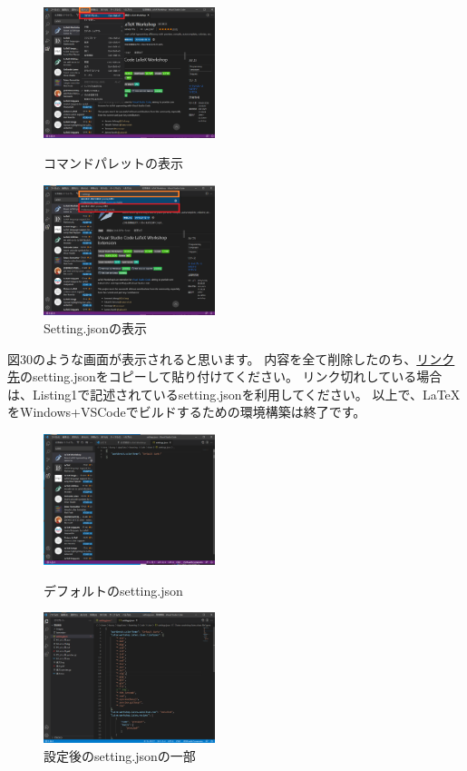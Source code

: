 \documentclass[dvipdfmx]{jsarticle}
\begin{document}
\begin{figure}[H]
    \begin{minipage}[b]{0.45\linewidth}
        \centering
        \includegraphics[width=5cm]{images/LaTeXWorkshop1.png}
        \caption{コマンドパレットの表示}
    \end{minipage}
    \begin{minipage}[b]{0.45\linewidth}
        \centering
        \includegraphics[width=5cm]{images/LaTeXWorkshop2.png}
        \caption{Setting.jsonの表示}
    \end{minipage}
\end{figure}

図30のような画面が表示されると思います。
内容を全て削除したのち、\href{https://github.com/CIT-NakamuraLab/thesis/blob/main/Windows/setting.json}{リンク先}のsetting.jsonをコピーして貼り付けてください。
リンク切れしている場合は、Listing1で記述されているsetting.jsonを利用してください。
以上で、LaTeXをWindows+VSCodeでビルドするための環境構築は終了です。

\begin{figure}[H]
    \begin{minipage}[b]{0.45\linewidth}
        \centering
        \includegraphics[width=5cm]{images/LaTeXWorkshop3.png}
        \caption{デフォルトのsetting.json}
    \end{minipage}
    \begin{minipage}[b]{0.45\linewidth}
        \centering
        \includegraphics[width=5cm]{images/LaTeXWorkshop4.png}
        \caption{設定後のsetting.jsonの一部}
    \end{minipage}
\end{figure}
\end{document}
